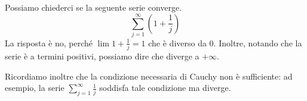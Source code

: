 \begin{example}
Possiamo chiederci se la seguente serie converge.
\begin{equation*}
\sum_{j=1}^\infty \left(1 + \frac{1}{j}\right)
\end{equation*}
La risposta è no, perché $\lim 1+\frac{1}{j} = 1$ che è diverso da 0. Inoltre, notando che la serie è a termini positivi, possiamo dire che diverge a $+\infty$.
\end{example}

Ricordiamo inoltre che la condizione necessaria di Cauchy non è sufficiente: ad esempio, la serie $\sum_{j=1}^\infty \frac{1}{j}$ soddisfa tale condizione ma diverge.